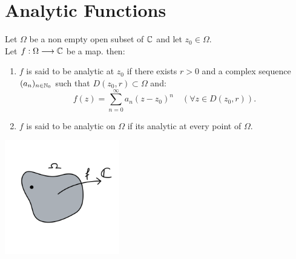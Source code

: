\section{Analytic Functions}
\begin{definition}[]
Let $\Omega  $ be a non empty open subset of $\mathbb{C}  $ and let $z_0 \in   \Omega  $. \\
Let $ f : \Omega  \longrightarrow \mathbb{C}  $ be a map. then: 
\begin{enumerate}
\item $f $ is said to be analytic at $z_0 $ if there exists $r > 0 $ and a complex sequence 
  $(a_n ) _{n \in   \mathbb{N}_0} $ such that $D(z_0, r) \subset \Omega  $  and: 
  \[
  f(z) = 
  \sum_{n=0}^{\infty} a_n (z-z_0) ^n \quad 
  \left( 
  \forall  z \in   D(z_0, r)
  \right).
  \]
  \item $f $ is said to be analytic on $\Omega  $ if its analytic at every point of 
    $\Omega $. 
\end{enumerate}
\end{definition}
\begin{center}
\includegraphics[width=5cm]{images/analytic.png}
\end{center}
